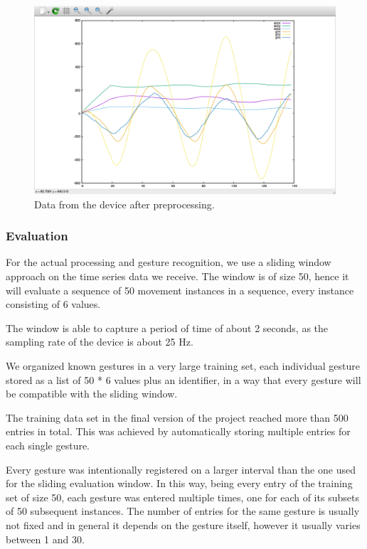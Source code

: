 \begin{figure}[h]
\centering
\includegraphics[width=1\columnwidth]{img/20}
\caption{Data from the device after preprocessing.}
\label{fig:figure3}
\end{figure}

\subsubsection{Evaluation}
For the actual processing and gesture recognition, we use a sliding window approach on the time series data we receive.
The window is of size 50, hence it will evaluate a sequence of 50 movement instances in a sequence,
every instance consisting of 6 values.

The window is able to capture a period of time of about 2 seconds, as the sampling rate of the device is about 25 Hz.

We organized known gestures in a very large training set, each individual gesture stored as a list of 50 * 6 values plus an identifier, in a way that every gesture will be compatible with the sliding window. 

The training data set in the final version of the project reached more than 500 entries in total.
This was achieved by automatically storing multiple entries for each single gesture.

Every gesture was intentionally registered on a larger interval than the one used for the sliding evaluation window.
In this way, being every entry of the training set of size 50,  each gesture was entered multiple times, one for each of its subsets of 50 subsequent instances.
The number of entries for the same gesture is usually not fixed and in general it depends on the gesture itself, however it usually varies between 1 and 30.

